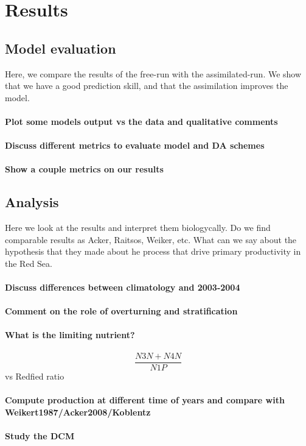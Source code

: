 \section{Results}

\subsection{Model evaluation}

Here, we compare the results of the free-run with the assimilated-run.
We show that we have a good prediction skill, and that the assimilation
improves the model.

\paragraph{Plot some models output vs the data and qualitative comments}

\paragraph{Discuss different metrics to evaluate model and DA schemes}

\paragraph{Show a couple metrics on our results}

\subsection{Analysis}

Here we look at the results and interpret them biologycally. Do we find
comparable results as Acker, Raitsos, Weiker, etc. What can we say about the
hypothesis that they made about he process that drive primary productivity in
the Red Sea.

\paragraph{Discuss differences between climatology and 2003-2004}

\paragraph{Comment on the role of overturning and stratification}

\paragraph{What is the limiting nutrient?}

$$\frac{N3N + N4N}{N1P}$$
vs Redfied ratio

\paragraph{Compute production at different time of years and compare
with Weikert1987/Acker2008/Koblentz}

\paragraph{Study the DCM}
